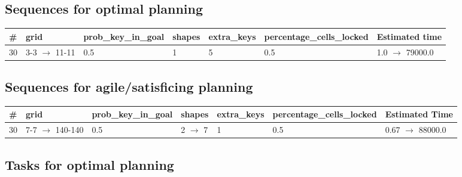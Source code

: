 \documentclass{article}
\begin{document}
                            \subsection*{Sequences for optimal planning}

                            \begin{center}
                            \begin{tabular}{@{}l|l|l|l|l|l|l@{}}
                            \# & grid & prob\_key\_in\_goal & shapes & extra\_keys & percentage\_cells\_locked & Estimated time\\\midrule
                            30&3-3 $\rightarrow$ 11-11&0.5&1&5&0.5&1.0 $\rightarrow$ 79000.0
                            \end{tabular}
                            \end{center}
                    
                         \subsection*{Sequences for agile/satisficing planning}

                        \begin{center}
                        \begin{tabular}{@{}l|l|l|l|l|l|l@{}}
                        \# & grid & prob\_key\_in\_goal & shapes & extra\_keys & percentage\_cells\_locked & Estimated Time\\\midrule
                        30&7-7 $\rightarrow$ 140-140&0.5&2 $\rightarrow$ 7&1&0.5&0.67 $\rightarrow$ 88000.0
                        \end{tabular}
                        \end{center}
                    
                                \subsection*{Tasks for optimal planning}
                                
\end{document}
